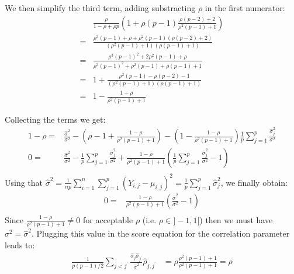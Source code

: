 \documentclass[12pt]{article}
\begin{document}
We then simplify the third term, adding substracting \(\rho\) in the first numerator:
\begin{align*}
& \frac{\rho}{1-\rho+\rho p} \left(1 + \rho (p-1) \frac{\rho(p-2)  + 2}{\rho^2(p-1) + 1} \right) \\
=& \frac{\rho^3(p-1) + \rho + \rho^2 (p-1)(\rho(p-2)+2) }{(\rho^2(p-1) + 1)(\rho(p-1)+1)}  \\
=& \frac{\rho^3(p-1)^2 + 2\rho^2(p-1) + \rho}{\rho^3(p-1)^2 + \rho^2(p-1) + \rho(p-1) + 1}  \\
=& 1 + \frac{\rho^2(p-1) - \rho (p-2) - 1}{(\rho^2(p-1) + 1)(\rho(p-1)+1)}  \\
=& 1 - \frac{1-\rho}{\rho^2(p-1) + 1} 
\end{align*}

Collecting the terms we get:
\begin{align*}
1- \rho =& \frac{\widehat{\sigma}^2}{\sigma^2}  - \left(\rho - 1 + \frac{1-\rho}{\rho^2(p-1) + 1}\right)  - \left(1 - \frac{1-\rho}{\rho^2(p-1) + 1} \right)\frac{1}{p} \sum_{j=1}^p \frac{\widehat{\sigma}^2_j}{\sigma^2}  \\
0 =& \frac{\widehat{\sigma}^2}{\sigma^2} -\frac{1}{p} \sum_{j=1}^p \frac{\widehat{\sigma}^2_j}{\sigma^2} + \frac{1-\rho}{\rho^2(p-1) + 1} \left(\frac{1}{p} \sum_{j=1}^p \frac{\widehat{\sigma}^2_j}{\sigma^2} - 1\right) \\
\end{align*}
Using that \(\widehat{\sigma}^2 = \frac{1}{np}\sum_{i=1}^n\sum_{j=1}^p (Y_{i,j}-\mu_{i,j})^2 = \frac{1}{p}\sum_{j=1}^p \widehat{\sigma}^2_j\), we finally obtain:
\begin{align*}
0 =& \frac{1-\rho}{\rho^2(p-1) + 1} \left(\frac{\widehat{\sigma}^2}{\sigma^2}-1\right) \\
\end{align*}
Since \(\frac{1-\rho}{\rho^2(p-1) + 1}\neq 0\) for acceptable \(\rho\)
(i.e. \(\rho \in ]-1,1[\)) then we must have \(\sigma^2 =
\widehat{\sigma}^2\). Plugging this value in the score equation for
the correlation parameter leads to:
\begin{align*}
\frac{1}{p(p-1)/2}\sum_{j < j^{\prime}}\frac{\widehat{\sigma}_j \widehat{\sigma}_{j^{\prime}}}{\widehat{\sigma}^2}\widehat{\rho}_{j,j^{\prime}} &= \rho
\frac{\rho^2(p-1) + 1}{\rho^2(p-1) + 1} = \rho
\end{align*}

\clearpage
\end{document}
